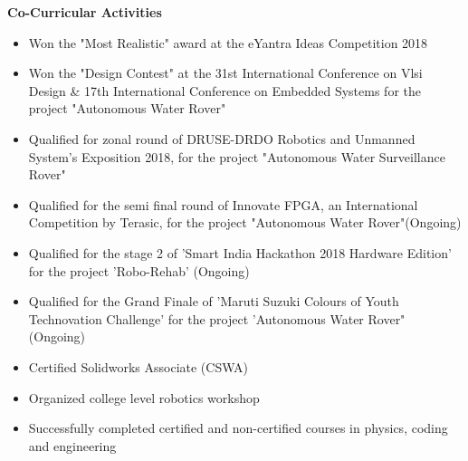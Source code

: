 \documentclass[letterpaper,11pt]{article}
\newcommand{\SmallSep}{\vspace{0.5em}}
\newcommand{\CVSection}[1]
{\Large\textbf{#1}\par
	\SmallSep\normalsize\normalfont}
\begin{document}
\CVSection{Co-Curricular Activities}

\begin{itemize}
	\item Won the "Most Realistic" award at the eYantra Ideas Competition 2018 
	\item Won the "Design Contest" at the 31st International Conference on Vlsi Design \& 17th International Conference on Embedded Systems for the project "Autonomous Water Rover"
	\item Qualified for zonal round of DRUSE-DRDO Robotics and Unmanned System's Exposition 2018, for the project "Autonomous Water Surveillance Rover"
	\item Qualified for the semi final round of Innovate FPGA, an International Competition by Terasic, for the project "Autonomous Water Rover"(Ongoing)
	\item Qualified for the stage 2 of 'Smart India Hackathon 2018 Hardware Edition' for the project 'Robo-Rehab' (Ongoing)
	\item Qualified for the Grand Finale of 'Maruti Suzuki Colours of Youth Technovation Challenge' for the project 'Autonomous Water Rover" (Ongoing)
	\item Certified Solidworks Associate (CSWA)
	\item Organized college level robotics workshop
	\item Successfully completed certified and non-certified courses in physics, coding and engineering 
	
\end{itemize} 

\textbf{}  \\
\end{document}
